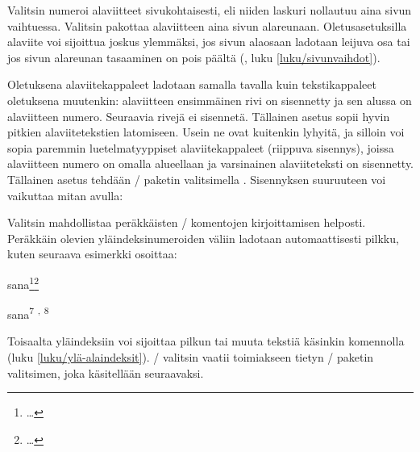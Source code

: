\begin{koodilohkosis}
\usepackage[norule]{footmisc}
\end{koodilohkosis}

Valitsin  numeroi alaviitteet sivukohtaisesti, eli niiden
laskuri nollautuu aina sivun vaihtuessa. Valitsin 
pakottaa alaviitteen aina sivun alareunaan. Oletusasetuksilla alaviite
voi sijoittua joskus ylemmäksi, jos sivun alaosaan ladotaan leijuva osa
tai jos sivun alareunan tasaaminen on pois päältä
(, luku \ref{luku/sivunvaihdot}).

Oletuksena alaviitekappaleet ladotaan samalla tavalla kuin
tekstikappaleet oletuksena muutenkin: alaviitteen ensimmäinen rivi on
sisennetty ja sen alussa on alaviitteen numero. Seuraavia rivejä ei
sisennetä. Tällainen asetus sopii hyvin pitkien alaviitetekstien
latomiseen. Usein ne ovat kuitenkin lyhyitä, ja silloin voi sopia
paremmin luetelmatyyppiset alaviitekappaleet (riippuva sisennys), joissa
alaviitteen numero on omalla alueellaan ja varsinainen alaviiteteksti on
sisennetty. Tällainen asetus tehdään \-/ paketin
valitsimella . Sisennyksen suuruuteen voi vaikuttaa mitan
 avulla:

\begin{koodilohkosis}
\usepackage[hang]{footmisc}
\setlength{\footnotemargin}{1.5em}
\end{koodilohkosis}

Valitsin  mahdollistaa peräkkäisten
\-/ komentojen kirjoittamisen helposti. Peräkkäin
olevien yläindeksinumeroiden väliin ladotaan automaattisesti pilkku,
kuten seuraava esimerkki osoittaa:

\begin{koodilohkosis}
sana\footnote{…}\footnote{…}
\end{koodilohkosis}

\begin{tulossis}
  sana\textsuperscript{7}%
  \textsuperscript*{,}%
  \textsuperscript{8}
\end{tulossis}

Toisaalta yläindeksiin voi sijoittaa pilkun tai muuta tekstiä käsinkin
komennolla  (luku \ref{luku/ylä-alaindeksit}).
\-/ valitsin vaatii toimiakseen tietyn
\-/ paketin valitsimen, joka käsitellään seuraavaksi.

